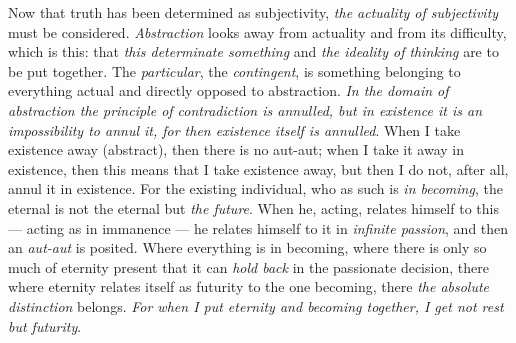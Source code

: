 \documentclass[12pt,a4paper,openany]{book}
\newcommand{\kpage}[1]{\marginnote{\footnotesize\textit{[#1]}}}
\begin{document}
Now that truth has been determined as subjectivity, \emph{the actuality
of subjectivity} must be considered. \emph{Abstraction} looks away from actuality
and from its difficulty, which is this: that \emph{this determinate something} and \emph{the ideality
of thinking} are to be put together. The \emph{particular}, the \emph{contingent}, is something
\kpage{121}belonging to everything actual and directly opposed to abstraction. \emph{In
the domain of abstraction the principle of contradiction is annulled, but in existence it is
an impossibility to annul it, for then existence itself is annulled}. When I take existence
away (abstract), then there is no aut-aut; when I take it
away in existence, then this means that I take existence away, but
then I do not, after all, annul it in existence. For the existing individual, who as
such is \emph{in becoming}, the eternal is not the eternal but \emph{the future}.
When he, acting, relates himself to this --- acting as in immanence
--- he relates himself to it in \emph{infinite passion}, and then an
\emph{aut-aut} is posited. Where everything is in becoming, where there is only so much of
eternity present that it can \emph{hold back} in the passionate decision,
there where eternity relates itself as futurity to the one
becoming, there \emph{the absolute distinction} belongs. \emph{For when I put
eternity and becoming together, I get not rest but futurity}.
\end{document}
